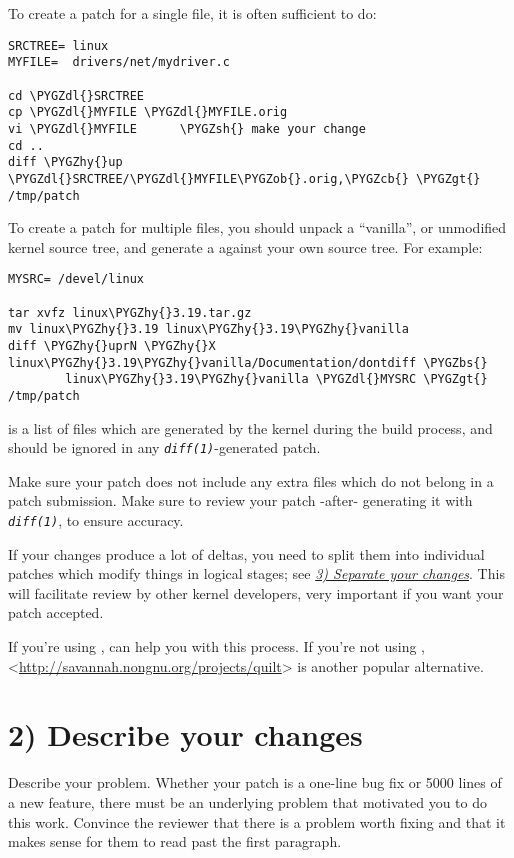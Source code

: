 \documentclass[a4paper,8pt,english]{sphinxmanual}
\def\PYGZbs{\char`\\}
\def\PYGZob{\char`\{}
\def\PYGZcb{\char`\}}
\def\PYGZgt{\char`\>}
\def\PYGZsh{\char`\#}
\def\PYGZdl{\char`\$}
\def\PYGZhy{\char`\-}
\begin{document}
To create a patch for a single file, it is often sufficient to do:

\begin{Verbatim}[commandchars=\\\{\}]
SRCTREE= linux
MYFILE=  drivers/net/mydriver.c

cd \PYGZdl{}SRCTREE
cp \PYGZdl{}MYFILE \PYGZdl{}MYFILE.orig
vi \PYGZdl{}MYFILE      \PYGZsh{} make your change
cd ..
diff \PYGZhy{}up \PYGZdl{}SRCTREE/\PYGZdl{}MYFILE\PYGZob{}.orig,\PYGZcb{} \PYGZgt{} /tmp/patch
\end{Verbatim}

To create a patch for multiple files, you should unpack a ``vanilla'',
or unmodified kernel source tree, and generate a  against your
own source tree.  For example:

\begin{Verbatim}[commandchars=\\\{\}]
MYSRC= /devel/linux

tar xvfz linux\PYGZhy{}3.19.tar.gz
mv linux\PYGZhy{}3.19 linux\PYGZhy{}3.19\PYGZhy{}vanilla
diff \PYGZhy{}uprN \PYGZhy{}X linux\PYGZhy{}3.19\PYGZhy{}vanilla/Documentation/dontdiff \PYGZbs{}
        linux\PYGZhy{}3.19\PYGZhy{}vanilla \PYGZdl{}MYSRC \PYGZgt{} /tmp/patch
\end{Verbatim}

 is a list of files which are generated by the kernel during
the build process, and should be ignored in any \emph{\texttt{diff(1)}}-generated
patch.

Make sure your patch does not include any extra files which do not
belong in a patch submission.  Make sure to review your patch -after-
generating it with \emph{\texttt{diff(1)}}, to ensure accuracy.

If your changes produce a lot of deltas, you need to split them into
individual patches which modify things in logical stages; see
{\hyperref[process/submitting\string-patches:split\string-changes]{\emph{3) Separate your changes}}}.  This will facilitate review by other kernel developers,
very important if you want your patch accepted.

If you're using ,  can help you with this process.  If
you're not using ,  \textless{}\href{http://savannah.nongnu.org/projects/quilt}{http://savannah.nongnu.org/projects/quilt}\textgreater{}
is another popular alternative.


\section{2) Describe your changes}
\label{process/submitting-patches:describe-your-changes}\label{process/submitting-patches:describe-changes}
Describe your problem.  Whether your patch is a one-line bug fix or
5000 lines of a new feature, there must be an underlying problem that
motivated you to do this work.  Convince the reviewer that there is a
problem worth fixing and that it makes sense for them to read past the
first paragraph.
\end{document}
